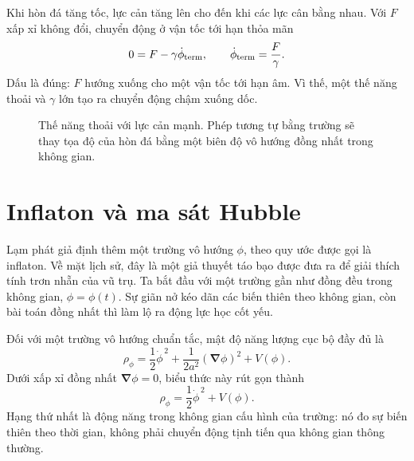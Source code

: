 Khi hòn đá tăng tốc, lực cản tăng lên cho đến khi các lực cân bằng nhau. Với \(F\) xấp xỉ không đổi, chuyển động ở vận tốc tới hạn thỏa mãn
\begin{equation}
0=F-\gamma\dot\phi_{\rm term},
\qquad
\dot\phi_{\rm term}=\frac{F}{\gamma}.
\end{equation}
Dấu là đúng: \(F\) hướng xuống cho một vận tốc tới hạn âm. Vì thế, một thế năng thoải và \(\gamma\) lớn tạo ra chuyển động chậm xuống dốc.

\begin{figure}[htbp]
\centering
{}
\caption{Thế năng thoải với lực cản mạnh. Phép tương tự bằng trường sẽ thay tọa độ của hòn đá bằng một biên độ vô hướng đồng nhất trong không gian.}
\label{fig:c08-shallow-potential}
\end{figure}

\section{Inflaton và ma sát Hubble}

Lạm phát giả định thêm một trường vô hướng \(\phi\), theo quy ước được gọi là inflaton. Về mặt lịch sử, đây là một giả thuyết táo bạo được đưa ra để giải thích tính trơn nhẵn của vũ trụ. Ta bắt đầu với một trường gần như đồng đều trong không gian, \(\phi=\phi(t)\). Sự giãn nở kéo dãn các biến thiên theo không gian, còn bài toán đồng nhất thì làm lộ ra động lực học cốt yếu.

Đối với một trường vô hướng chuẩn tắc, mật độ năng lượng cục bộ đầy đủ là
\begin{equation}
\rho_\phi
=
\frac12\dot\phi^{\,2}
+\frac{1}{2a^2}(\boldsymbol\nabla\phi)^2
+V(\phi).
\end{equation}
Dưới xấp xỉ đồng nhất \(\boldsymbol\nabla\phi=0\), biểu thức này rút gọn thành
\begin{equation}
\rho_\phi=\frac12\dot\phi^{\,2}+V(\phi).
\label{eq:c08-scalar-density}
\end{equation}
Hạng thứ nhất là động năng trong không gian cấu hình của trường: nó đo sự biến thiên theo thời gian, không phải chuyển động tịnh tiến qua không gian thông thường.

